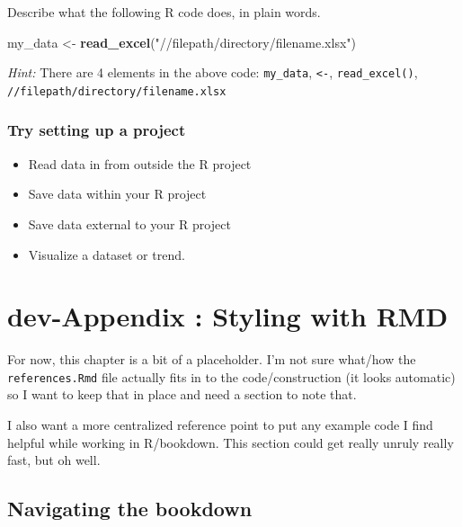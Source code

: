 \documentclass[
]{book}
\newenvironment{Shaded}{\begin{snugshade}}{\end{snugshade}}
\newcommand{\FunctionTok}[1]{\textcolor[rgb]{0.13,0.29,0.53}{\textbf{#1}}}
\newcommand{\NormalTok}[1]{#1}
\newcommand{\OtherTok}[1]{\textcolor[rgb]{0.56,0.35,0.01}{#1}}
\newcommand{\StringTok}[1]{\textcolor[rgb]{0.31,0.60,0.02}{#1}}
\providecommand{\tightlist}{%
  \setlength{\itemsep}{0pt}\setlength{\parskip}{0pt}}
\begin{document}
Describe what the following R code does, in plain words.

\begin{Shaded}
\begin{Highlighting}[]
\NormalTok{my\_data }\OtherTok{\textless{}{-}} \FunctionTok{read\_excel}\NormalTok{(}\StringTok{"//filepath/directory/filename.xlsx"}\NormalTok{)}
\end{Highlighting}
\end{Shaded}

\emph{Hint:} There are 4 elements in the above code:
\texttt{my\_data},
\texttt{\textless{}-},
\texttt{read\_excel()},
\texttt{//filepath/directory/filename.xlsx}

\hypertarget{try-setting-up-a-project}{%
\subsection{Try setting up a project}\label{try-setting-up-a-project}}

\begin{itemize}
\tightlist
\item
  Read data in from outside the R project
\item
  Save data within your R project
\item
  Save data external to your R project
\item
  Visualize a dataset or trend.
\end{itemize}

\hypertarget{dev-appendix-styling-with-rmd}{%
\chapter*{dev-Appendix : Styling with RMD}\label{dev-appendix-styling-with-rmd}}

For now, this chapter is a bit of a placeholder. I'm not sure what/how
the \texttt{references.Rmd} file actually fits in to the code/construction (it
looks automatic) so I want to keep that in place and need a section to
note that.

I also want a more centralized reference point to put any example code I
find helpful while working in R/bookdown. This section could get really
unruly really fast, but oh well.

\hypertarget{navigating-the-bookdown}{%
\section*{Navigating the bookdown}\label{navigating-the-bookdown}}
\end{document}
